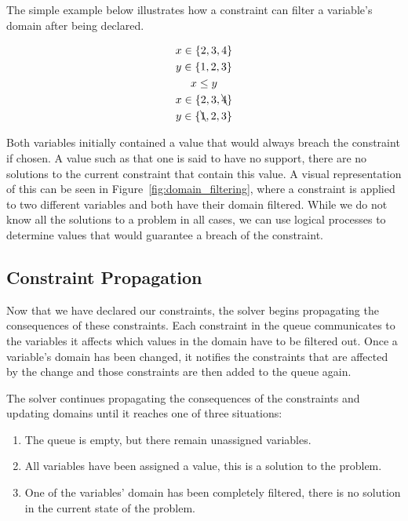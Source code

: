 \documentclass[../Document.tex]{subfiles}
\begin{document}
The simple example below illustrates how a constraint can filter a variable's domain after being declared.

\begin{gather*}
    x \in \{2,3,4\}\\
    y \in \{1,2,3\}\\
    x \leq y\\
    x \in \{2,3,\bcancel{4}\}\\
    y \in \{\bcancel{1},2,3\}
\end{gather*}

Both variables initially contained a value that would always breach the constraint if chosen. A value such as that one is said to have no support, \ie there are no solutions to the current constraint that contain this value. A visual representation of this can be seen in Figure~\ref{fig:domain_filtering}, where a constraint is applied to two different variables and both have their domain filtered. While we do not know all the solutions to a problem in all cases, we can use logical processes to determine values that would guarantee a breach of the constraint.


\subsection{Constraint Propagation}
Now that we have declared our constraints, the solver begins propagating the consequences of these constraints. Each constraint in the queue communicates to the variables it affects which values in the domain have to be filtered out. Once a variable's domain has been changed, it notifies the constraints that are affected by the change and those constraints are then added to the queue again.

The solver continues propagating the consequences of the constraints and updating domains until it reaches one of three situations: 
\begin{enumerate}
    \item The queue is empty, but there remain unassigned variables.
    \item All variables have been assigned a value, this is a solution to the problem.
    \item One of the variables' domain has been completely filtered, there is no solution in the current state of the problem.
\end{enumerate}
\end{document}
